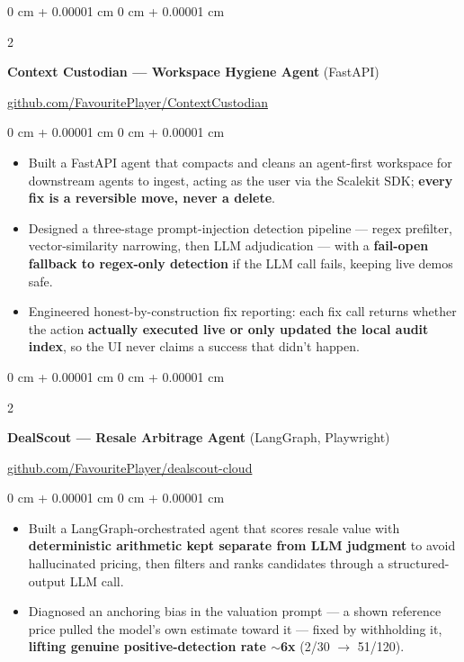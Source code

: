 \documentclass[10pt, letterpaper]{article}
\newenvironment{highlights}{
    \begin{itemize}[
        topsep=0.3 cm,
        parsep=0.05 cm,
        partopsep=0pt,
        itemsep=0.02 cm,
        leftmargin=0 cm + 10pt
    ]
}{
    \end{itemize}
} %
\newenvironment{onecolentry}{
    \begin{adjustwidth}{
        0 cm + 0.00001 cm
    }{
        0 cm + 0.00001 cm
    }
}{
    \end{adjustwidth}
} %
\newenvironment{extendedtwocolentry}[2][]{
    \onecolentry
    \def\secondColumn{#2}
    \setcolumnwidth{\fill, 8 cm}
    \begin{paracol}{2}
}{
    \switchcolumn \raggedleft \secondColumn
    \end{paracol}
    \endonecolentry
}
\begin{document}
        \begin{extendedtwocolentry}{
            \href{https://github.com/FavouritePlayer/ContextCustodian}{github.com/FavouritePlayer/ContextCustodian}
        }
            \textbf{Context Custodian — Workspace Hygiene Agent} (FastAPI)
        \end{extendedtwocolentry}

        \vspace{0.10 cm}
        \begin{onecolentry}
            \begin{highlights}
                \item Built a FastAPI agent that compacts and cleans an agent-first workspace for downstream agents to ingest, acting as the user via the Scalekit SDK; \textbf{every fix is a reversible move, never a delete}.
                \item Designed a three-stage prompt-injection detection pipeline — regex prefilter, vector-similarity narrowing, then LLM adjudication — with a \textbf{fail-open fallback to regex-only detection} if the LLM call fails, keeping live demos safe.
                \item Engineered honest-by-construction fix reporting: each fix call returns whether the action \textbf{actually executed live or only updated the local audit index}, so the UI never claims a success that didn't happen.
            \end{highlights}
        \end{onecolentry}

        \begin{extendedtwocolentry}{
            \href{https://github.com/FavouritePlayer/dealscout-cloud}{github.com/FavouritePlayer/dealscout-cloud}
        }
            \textbf{DealScout — Resale Arbitrage Agent} (LangGraph, Playwright)
        \end{extendedtwocolentry}

        \vspace{0.10 cm}
        \begin{onecolentry}
            \begin{highlights}
                \item Built a LangGraph-orchestrated agent that scores resale value with \textbf{deterministic arithmetic kept separate from LLM judgment} to avoid hallucinated pricing, then filters and ranks candidates through a structured-output LLM call.
                \item Diagnosed an anchoring bias in the valuation prompt — a shown reference price pulled the model's own estimate toward it — fixed by withholding it, \textbf{lifting genuine positive-detection rate $\sim$6x} (2/30 $\rightarrow$ 51/120).
            \end{highlights}
        \end{onecolentry}
\end{document}
